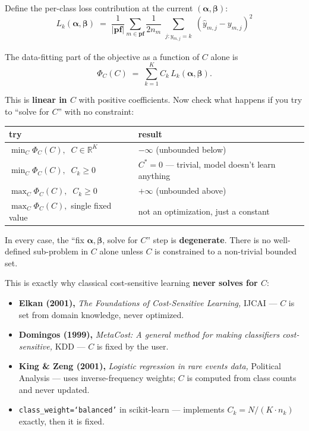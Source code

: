 \documentclass[11pt,a4paper]{article}
\begin{document}
Define the per-class loss contribution at the current $(\boldsymbol{\alpha}, \boldsymbol{\beta})$:
\[
L_k(\boldsymbol{\alpha},\boldsymbol{\beta}) \;=\; \frac{1}{|\mathbf{pf}|}\sum_{m \in \mathbf{pf}}\frac{1}{2 n_m}\!\!\sum_{\substack{j: y_{m,j} = k}}\!(\hat{y}_{m,j} - y_{m,j})^{2}
\]

The data-fitting part of the objective as a function of $C$ alone is
\[
\Phi_C(C) \;=\; \sum_{k=1}^{K} C_k\,L_k(\boldsymbol{\alpha},\boldsymbol{\beta}).
\]

This is \textbf{linear in $C$} with positive coefficients. Now check what happens if you try to ``solve for $C$'' with no constraint:

\begin{center}
\begin{tabular}{ll}
\toprule
\textbf{try} & \textbf{result} \\
\midrule
$\min_C \Phi_C(C),\;\; C \in \mathbb{R}^K$ & $-\infty$ (unbounded below) \\
$\min_C \Phi_C(C),\;\; C_k \geq 0$ & $C^* = 0$ --- trivial, model doesn't learn anything \\
$\max_C \Phi_C(C),\;\; C_k \geq 0$ & $+\infty$ (unbounded above) \\
$\max_C \Phi_C(C),$ single fixed value & not an optimization, just a constant \\
\bottomrule
\end{tabular}
\end{center}

In every case, the ``fix $\boldsymbol{\alpha}, \boldsymbol{\beta}$, solve for $C$'' step is \textbf{degenerate}. There is no well-defined sub-problem in $C$ alone unless $C$ is constrained to a non-trivial bounded set.

This is exactly why classical cost-sensitive learning \textbf{never solves for $C$}:
\begin{itemize}[leftmargin=*,itemsep=2pt]
  \item \textbf{Elkan (2001),} \emph{The Foundations of Cost-Sensitive Learning,} IJCAI --- $C$ is set from domain knowledge, never optimized.
  \item \textbf{Domingos (1999),} \emph{MetaCost: A general method for making classifiers cost-sensitive,} KDD --- $C$ is fixed by the user.
  \item \textbf{King \& Zeng (2001),} \emph{Logistic regression in rare events data,} Political Analysis --- uses inverse-frequency weights; $C$ is computed from class counts and never updated.
  \item \texttt{class\_weight=`balanced'} in scikit-learn --- implements $C_k = N/(K \cdot n_k)$ exactly, then it is fixed.
\end{itemize}
\end{document}
